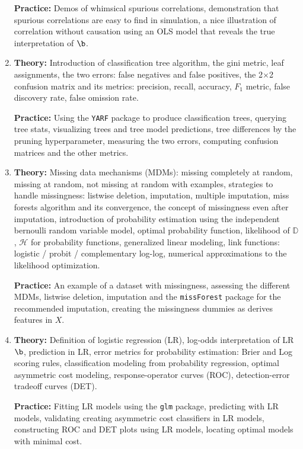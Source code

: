 \begin{enumerate}[(1)]
\textbf{Practice:} Demos of whimsical spurious correlations, demonstration that spurious correlations are easy to find in simulation, a nice illustration of correlation without causation using an OLS model that reveals the true interpretation of $\b$.

\item \textbf{Theory:} Introduction of classification tree algorithm, the gini metric, leaf assignments, the two errors: false negatives and false positives, the 2$\times$2 confusion matrix and its metrics: precision, recall, accuracy, $F_1$ metric, false discovery rate, false omission rate.

\textbf{Practice:} Using the \texttt{YARF} package to produce classification trees, querying tree stats, visualizing trees and tree model predictions, tree differences by the pruning hyperparameter, measuring the two errors, computing confusion matrices and the other metrics.

\item \textbf{Theory:} Missing data mechanisms (MDMs): missing completely at random, missing at random, not missing at random with examples, strategies to handle missingness: listwise deletion, imputation, multiple imputation, miss forests algorithm and its convergence, the concept of  missingness even after imputation, introduction of probability estimation using the independent bernoulli random variable model, optimal probability function, likelihood of $\mathbb{D}$, $\mathcal{H}$ for probability functions, generalized linear modeling, link functions: logistic / probit / complementary log-log, numerical approximations to the likelihood optimization.

\textbf{Practice:} An example of a dataset with missingness, assessing the different MDMs, listwise deletion, imputation and the \texttt{missForest} package for the recommended imputation, creating the missingness dummies as derives features in $X$.

\item \textbf{Theory:} Definition of logistic regression (LR), log-odds interpretation of LR $\b$, prediction in LR, error metrics for probability estimation: Brier and Log scoring rules, classification modeling from probability regression, optimal asymmetric cost modeling, response-operator curves (ROC), detection-error tradeoff curves (DET).

\textbf{Practice:} Fitting LR models using the \texttt{glm} package, predicting with LR models, validating creating asymmetric cost classifiers in LR models, constructing ROC and DET plots using LR models, locating optimal models with minimal cost. 


\end{enumerate}
